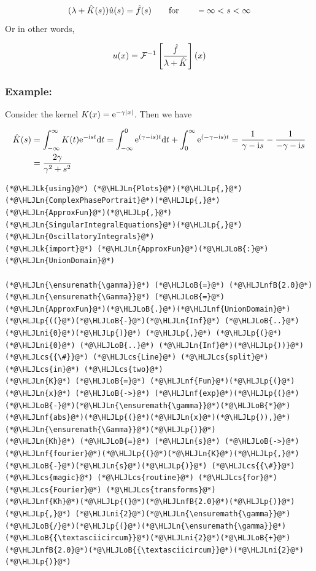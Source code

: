 \documentclass[12pt,a4paper]{article}
\newcommand{\HLJLk}[1]{\textcolor[RGB]{148,91,176}{\textbf{#1}}}
\newcommand{\HLJLn}[1]{#1}
\newcommand{\HLJLnf}[1]{\textcolor[RGB]{66,102,213}{#1}}
\newcommand{\HLJLnfB}[1]{\textcolor[RGB]{59,151,46}{#1}}
\newcommand{\HLJLni}[1]{\textcolor[RGB]{59,151,46}{#1}}
\newcommand{\HLJLoB}[1]{\textcolor[RGB]{102,102,102}{\textbf{#1}}}
\newcommand{\HLJLp}[1]{#1}
\newcommand{\HLJLcs}[1]{\textcolor[RGB]{153,153,119}{\textit{#1}}}
\def\qqfor{\qquad\hbox{for}\qquad}
\def\D{ {\rm d} }
\def\I{ {\rm i} }
\def\E{ {\rm e} }
\def\dt{\D t}
\begin{document}
\[
(\lambda + \hat K(s)) \hat u(s) = \hat f(s) \qqfor -\infty < s < \infty
\]
Or in other words,

\[
u(x) = {\cal F}^{-1} \left[{\hat f \over \lambda + \hat K }\right](x)
\]
\subsubsection{Example:}
Consider the kernel $K(x) = \E^{-\gamma |x|}$. Then we have


\begin{align*}
\hat K(s) &= \int_{-\infty}^\infty K(t) \E^{-\I s t} \dt = \int_{-\infty}^0 \E^{( \gamma - \I s ) t} \dt  + \int_0^\infty \E^{(-\gamma - \I s ) t} = {1 \over  \gamma - \I s} - {1 \over -\gamma - \I s } \\
&= {2\gamma \over \gamma^2 + s^2}
\end{align*}

\begin{lstlisting}
(*@\HLJLk{using}@*) (*@\HLJLn{Plots}@*)(*@\HLJLp{,}@*) (*@\HLJLn{ComplexPhasePortrait}@*)(*@\HLJLp{,}@*) (*@\HLJLn{ApproxFun}@*)(*@\HLJLp{,}@*) (*@\HLJLn{SingularIntegralEquations}@*)(*@\HLJLp{,}@*) (*@\HLJLn{OscillatoryIntegrals}@*)
(*@\HLJLk{import}@*) (*@\HLJLn{ApproxFun}@*)(*@\HLJLoB{:}@*) (*@\HLJLn{UnionDomain}@*)

(*@\HLJLn{\ensuremath{\gamma}}@*) (*@\HLJLoB{=}@*) (*@\HLJLnfB{2.0}@*)
(*@\HLJLn{\ensuremath{\Gamma}}@*) (*@\HLJLoB{=}@*) (*@\HLJLn{ApproxFun}@*)(*@\HLJLoB{.}@*)(*@\HLJLnf{UnionDomain}@*)(*@\HLJLp{((}@*)(*@\HLJLoB{-}@*)(*@\HLJLn{Inf}@*) (*@\HLJLoB{..}@*) (*@\HLJLni{0}@*)(*@\HLJLp{)}@*) (*@\HLJLp{,}@*) (*@\HLJLp{(}@*)(*@\HLJLni{0}@*) (*@\HLJLoB{..}@*) (*@\HLJLn{Inf}@*)(*@\HLJLp{))}@*) (*@\HLJLcs{{\#}}@*) (*@\HLJLcs{Line}@*) (*@\HLJLcs{split}@*) (*@\HLJLcs{in}@*) (*@\HLJLcs{two}@*)
(*@\HLJLn{K}@*) (*@\HLJLoB{=}@*) (*@\HLJLnf{Fun}@*)(*@\HLJLp{(}@*)(*@\HLJLn{x}@*) (*@\HLJLoB{->}@*) (*@\HLJLnf{exp}@*)(*@\HLJLp{(}@*)(*@\HLJLoB{-}@*)(*@\HLJLn{\ensuremath{\gamma}}@*)(*@\HLJLoB{*}@*)(*@\HLJLnf{abs}@*)(*@\HLJLp{(}@*)(*@\HLJLn{x}@*)(*@\HLJLp{)),}@*) (*@\HLJLn{\ensuremath{\Gamma}}@*)(*@\HLJLp{)}@*)
(*@\HLJLn{Kh}@*) (*@\HLJLoB{=}@*) (*@\HLJLn{s}@*) (*@\HLJLoB{->}@*) (*@\HLJLnf{fourier}@*)(*@\HLJLp{(}@*)(*@\HLJLn{K}@*)(*@\HLJLp{,}@*) (*@\HLJLoB{-}@*)(*@\HLJLn{s}@*)(*@\HLJLp{)}@*) (*@\HLJLcs{{\#}}@*) (*@\HLJLcs{magic}@*) (*@\HLJLcs{routine}@*) (*@\HLJLcs{for}@*) (*@\HLJLcs{Fourier}@*) (*@\HLJLcs{transforms}@*)
(*@\HLJLnf{Kh}@*)(*@\HLJLp{(}@*)(*@\HLJLnfB{2.0}@*)(*@\HLJLp{)}@*) (*@\HLJLp{,}@*) (*@\HLJLni{2}@*)(*@\HLJLn{\ensuremath{\gamma}}@*)(*@\HLJLoB{/}@*)(*@\HLJLp{(}@*)(*@\HLJLn{\ensuremath{\gamma}}@*)(*@\HLJLoB{{\textasciicircum}}@*)(*@\HLJLni{2}@*)(*@\HLJLoB{+}@*)(*@\HLJLnfB{2.0}@*)(*@\HLJLoB{{\textasciicircum}}@*)(*@\HLJLni{2}@*)(*@\HLJLp{)}@*)
\end{lstlisting}
\end{document}
